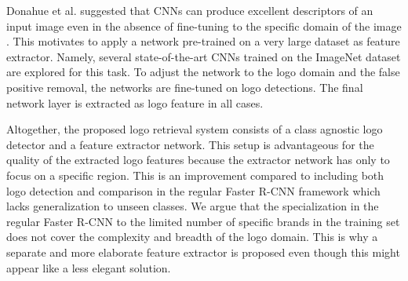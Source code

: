 \documentclass[a4paper,twoside]{article}
\begin{document}
Donahue et al. suggested that \acp{CNN} can produce excellent descriptors of an input image  even in the absence of fine-tuning to the specific domain of the image \cite{donahue2015}. 
This motivates to apply a network pre-trained on a very large dataset as feature extractor. Namely, several state-of-the-art \acp{CNN} trained on the ImageNet dataset \cite{deng2009} are explored for this task. To adjust the network to the logo domain and the false positive removal, the networks are fine-tuned on logo detections. The final network layer is extracted as logo feature in all cases.

Altogether, the proposed logo retrieval system consists of a class agnostic logo detector and a feature extractor network. This setup is advantageous for the quality of the extracted logo features because the extractor network has only to focus on a specific region.
This is an improvement compared to including both logo detection and comparison in the regular Faster R-CNN framework which lacks generalization to unseen classes. We argue that the specialization in the regular Faster R-CNN to the limited number of specific brands in the training set does not cover the complexity and breadth of the logo domain. This is why a separate and more elaborate feature extractor is proposed even though this might appear like a less elegant solution.
\end{document}
